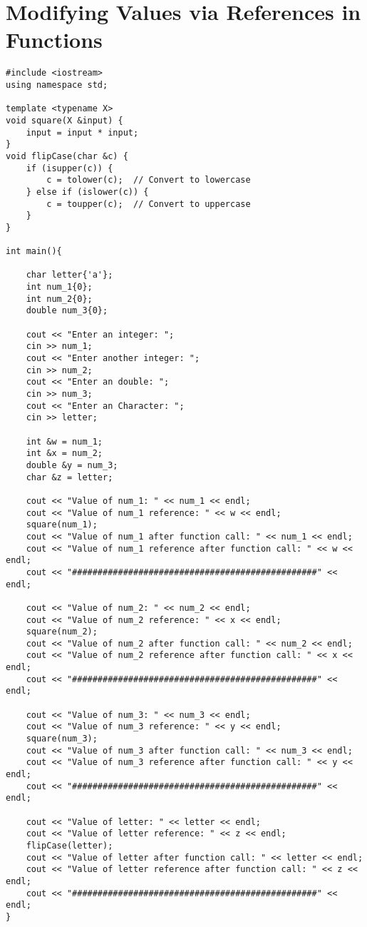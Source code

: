 \documentclass[12pt]{article}
\begin{document}
\section*{Modifying Values via References in Functions}
\begin{verbatim}
#include <iostream>
using namespace std;

template <typename X>
void square(X &input) {
    input = input * input;
}
void flipCase(char &c) {
    if (isupper(c)) {
        c = tolower(c);  // Convert to lowercase
    } else if (islower(c)) {
        c = toupper(c);  // Convert to uppercase
    }
}

int main(){

    char letter{'a'};
    int num_1{0};
    int num_2{0};
    double num_3{0};

    cout << "Enter an integer: ";
    cin >> num_1;
    cout << "Enter another integer: ";
    cin >> num_2;
    cout << "Enter an double: ";
    cin >> num_3;
    cout << "Enter an Character: ";
    cin >> letter;

    int &w = num_1;
    int &x = num_2;
    double &y = num_3;
    char &z = letter;

    cout << "Value of num_1: " << num_1 << endl;
    cout << "Value of num_1 reference: " << w << endl;
    square(num_1);
    cout << "Value of num_1 after function call: " << num_1 << endl;
    cout << "Value of num_1 reference after function call: " << w << endl;
    cout << "################################################" << endl;

    cout << "Value of num_2: " << num_2 << endl; 
    cout << "Value of num_2 reference: " << x << endl;
    square(num_2);
    cout << "Value of num_2 after function call: " << num_2 << endl;
    cout << "Value of num_2 reference after function call: " << x << endl;
    cout << "################################################" << endl;

    cout << "Value of num_3: " << num_3 << endl; 
    cout << "Value of num_3 reference: " << y << endl;
    square(num_3);
    cout << "Value of num_3 after function call: " << num_3 << endl; 
    cout << "Value of num_3 reference after function call: " << y << endl;
    cout << "################################################" << endl;

    cout << "Value of letter: " << letter << endl; 
    cout << "Value of letter reference: " << z << endl;
    flipCase(letter);
    cout << "Value of letter after function call: " << letter << endl; 
    cout << "Value of letter reference after function call: " << z << endl;
    cout << "################################################" << endl;
}
\end{verbatim}
\end{document}
